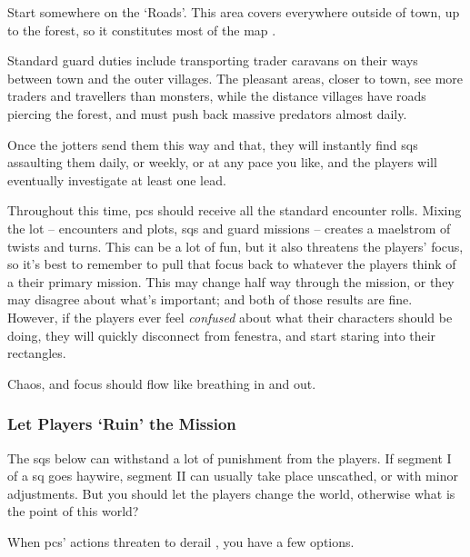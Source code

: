 \begin{multicols}{2}
Start somewhere on the `Roads'.
This area covers everywhere outside of town, up to the forest, so it constitutes most of the map .

Standard \gls{guard} duties%
include transporting trader caravans on their ways between \gls{town} and the outer \glspl{village}.
The pleasant areas, closer to \gls{town}, see more traders and travellers than monsters, while the distance \glspl{village} have roads piercing the forest, and must push back massive predators almost daily.

Once the \glspl{jotter} send them this way and that, they will instantly find \glspl{sq} assaulting them daily, or weekly, or at any pace you like, and the players will eventually investigate at least one lead.

Throughout this time, \glspl{pc} should receive all the standard encounter rolls.
Mixing the lot -- encounters and plots, \glspl{sq} and \gls{guard} missions -- creates a maelstrom of twists and turns.
This can be a lot of fun, but it also threatens the players' focus, so it's best to remember to pull that focus back to whatever the players think of a their primary mission.
This may change half way through the mission, or they may disagree about what's important; and both of those results are fine.
However, if the players ever feel \emph{confused} about what their characters should be doing, they will quickly disconnect from \gls{fenestra}, and start staring into their rectangles.

Chaos, and focus should flow like breathing in and out.

\subsubsection{Let Players `Ruin' the Mission}

The \glspl{sq} below can withstand a lot of punishment from the players.
If \gls{segment} I of a \gls{sq} goes haywire, \gls{segment} II can usually take place unscathed, or with minor adjustments.
But you should let the players change the world, otherwise what is the point of this world?

When \glspl{pc}' actions threaten to derail , you have a few options.


\end{multicols}
